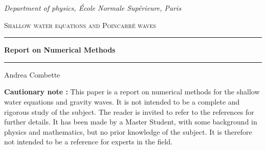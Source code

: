 \documentclass[11pt,a4paper]{report}
\author{Andrea}
\begin{document}
\begin{titlepage}
    \begin{center}
        \vspace*{2cm}
        \emph{\footnotesize{Department of physics, École Normale Supérieure, Paris}}

        \vspace*{1cm}

        \textsc{Shallow water equations and Poincarré waves}
        \vspace*{1cm}

        \rule{14cm}{2pt}\vspace{.7cm}

        \Large{\textbf{Report on Numerical Methods}}

        \vspace{.5cm}
        \rule{14cm}{2pt}
        \vspace{1cm}

        \Large Andrea Combette

        \vspace{3cm}

        \raisebox{-5pt}{\quad\decofourleft\decotwo\decofourright\quad}

        \vspace{6cm}

        \begin{minipage}{14cm}
            \small{
                \textbf{Cautionary note : } This paper is a report on numerical methods for the shallow water equations and gravity waves. It is not intended to be a complete and rigorous study of the subject. The reader is invited to refer to the references for further details.
                It has been made by a Master Student, with some background in physics and mathematics, but no prior knowledge of the subject. It is therefore not intended to be a reference for experts in the field.}
        \end{minipage}

    \end{center}

\end{titlepage}
\end{document}
